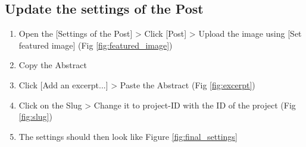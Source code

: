 \subsection*{Update the settings of the Post}\label{ssec:settings}
\begin{enumerate}
    \item Open the [Settings of the Post] > Click [Post] > Upload the image using [Set featured image] (Fig \ref{fig:featured_image})
    \item Copy the Abstract
    \item Click [Add an excerpt...] > Paste the Abstract (Fig \ref{fig:excerpt})
    \item Click on the Slug > Change it to project-{ID} with the ID of the project (Fig \ref{fig:slug})
    \item The settings should then look like Figure \ref{fig:final_settings}
\end{enumerate}
\

